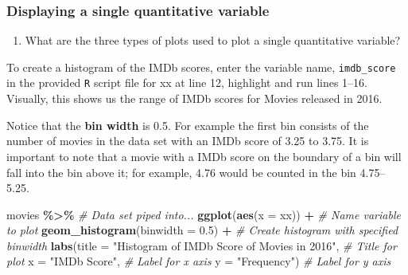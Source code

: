 \documentclass[
]{report}
\newenvironment{Shaded}{\begin{snugshade}}{\end{snugshade}}
\newcommand{\CommentTok}[1]{\textcolor[rgb]{0.56,0.35,0.01}{\textit{#1}}}
\newcommand{\DataTypeTok}[1]{\textcolor[rgb]{0.13,0.29,0.53}{#1}}
\newcommand{\FloatTok}[1]{\textcolor[rgb]{0.00,0.00,0.81}{#1}}
\newcommand{\KeywordTok}[1]{\textcolor[rgb]{0.13,0.29,0.53}{\textbf{#1}}}
\newcommand{\NormalTok}[1]{#1}
\newcommand{\OperatorTok}[1]{\textcolor[rgb]{0.81,0.36,0.00}{\textbf{#1}}}
\newcommand{\StringTok}[1]{\textcolor[rgb]{0.31,0.60,0.02}{#1}}
\providecommand{\tightlist}{%
  \setlength{\itemsep}{0pt}\setlength{\parskip}{0pt}}
\begin{document}
\hypertarget{displaying-a-single-quantitative-variable}{%
\subsubsection*{Displaying a single quantitative variable}\label{displaying-a-single-quantitative-variable}}

\begin{enumerate}
\def\labelenumi{\arabic{enumi}.}
\setcounter{enumi}{6}
\tightlist
\item
  What are the three types of plots used to plot a single quantitative variable?
\end{enumerate}

\vspace{1in}

To create a histogram of the IMDb scores, enter the variable name, \texttt{imdb\_score} in the provided \texttt{R} script file for xx at line 12, highlight and run lines 1--16. Visually, this shows us the range of IMDb scores for Movies released in 2016.

Notice that the \textbf{bin width} is 0.5. For example the first bin consists of the number of movies in the data set with an IMDb score of 3.25 to 3.75. It is important to note that a movie with a IMDb score on the boundary of a bin will fall into the bin above it; for example, 4.76 would be counted in the bin 4.75--5.25.

\begin{Shaded}
\begin{Highlighting}[]
\NormalTok{movies }\OperatorTok{\%\textgreater{}\%}\StringTok{ }\CommentTok{\# Data set piped into...}
\KeywordTok{ggplot}\NormalTok{(}\KeywordTok{aes}\NormalTok{(}\DataTypeTok{x =}\NormalTok{ xx)) }\OperatorTok{+}\StringTok{   }\CommentTok{\# Name variable to plot}
\StringTok{  }\KeywordTok{geom\_histogram}\NormalTok{(}\DataTypeTok{binwidth =} \FloatTok{0.5}\NormalTok{) }\OperatorTok{+}\StringTok{  }\CommentTok{\# Create histogram with specified binwidth}
\StringTok{  }\KeywordTok{labs}\NormalTok{(}\DataTypeTok{title =} \StringTok{"Histogram of IMDb Score of Movies in 2016"}\NormalTok{, }\CommentTok{\# Title for plot}
       \DataTypeTok{x =} \StringTok{"IMDb Score"}\NormalTok{, }\CommentTok{\# Label for x axis}
       \DataTypeTok{y =} \StringTok{"Frequency"}\NormalTok{) }\CommentTok{\# Label for y axis}
\end{Highlighting}
\end{Shaded}
\end{document}

